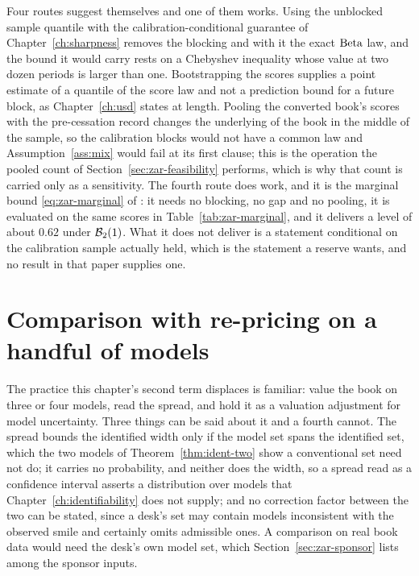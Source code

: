 \documentclass[../../../main.tex]{subfiles}
\begin{document}
\begin{remark}\label{rem:zar-notrepair}
Four routes suggest themselves and one of them works. Using the unblocked sample quantile with the calibration-conditional guarantee of Chapter~\ref{ch:sharpness} removes the blocking and with it the exact $\operatorname{Beta}$ law, and the bound it would carry rests on a Chebyshev inequality whose value at two dozen periods is larger than one. Bootstrapping the scores supplies a point estimate of a quantile of the score law and not a prediction bound for a future block, as Chapter~\ref{ch:usd} states at length. Pooling the converted book's scores with the pre-cessation record changes the underlying of the book in the middle of the sample, so the calibration blocks would not have a common law and Assumption~\ref{ass:mix} would fail at its first clause; this is the operation the pooled count of Section~\ref{sec:zar-feasibility} performs, which is why that count is carried only as a sensitivity. The fourth route does work, and it is the marginal bound \eqref{eq:zar-marginal} of \citet[Cor.~1]{barber2026}: it needs no blocking, no gap and no pooling, it is evaluated on the same scores in Table~\ref{tab:zar-marginal}, and it delivers a level of about $0.62$ under $\mathcal B_{2}(1)$. What it does not deliver is a statement conditional on the calibration sample actually held, which is the statement a reserve wants, and no result in that paper supplies one.
\end{remark}

\section{Comparison with re-pricing on a handful of models}\label{sec:zar-models}

The practice this chapter's second term displaces is familiar: value the book on three or four models, read the spread, and hold it as a valuation adjustment for model uncertainty. Three things can be said about it and a fourth cannot. The spread bounds the identified width only if the model set spans the identified set, which the two models of Theorem~\ref{thm:ident-two} show a conventional set need not do; it carries no probability, and neither does the width, so a spread read as a confidence interval asserts a distribution over models that Chapter~\ref{ch:identifiability} does not supply; and no correction factor between the two can be stated, since a desk's set may contain models inconsistent with the observed smile and certainly omits admissible ones. A comparison on real book data would need the desk's own model set, which Section~\ref{sec:zar-sponsor} lists among the sponsor inputs.
\end{document}
